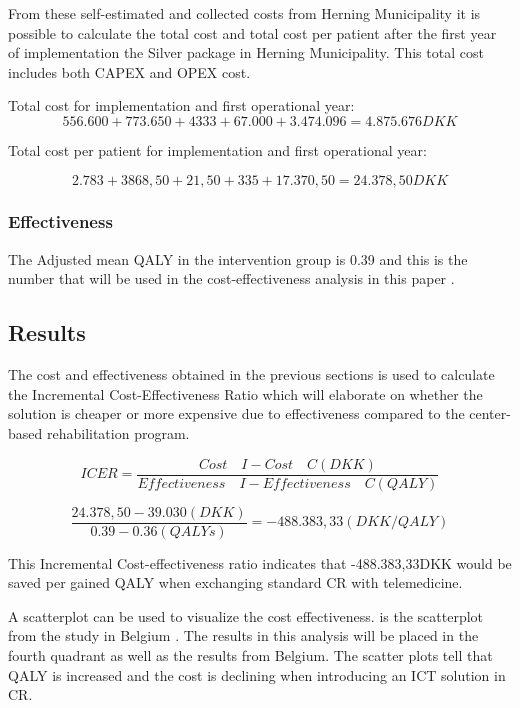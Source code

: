 From these self-estimated and collected costs from Herning Municipality it is possible to calculate the total cost and total cost per patient after the first year of implementation the Silver package in Herning Municipality. This total cost includes both CAPEX and OPEX cost.

Total cost for implementation and first operational year:
$$556.600 + 773.650 + 4333 + 67.000 + 3.474.096 = 4.875.676DKK$$

Total cost per patient for implementation and first operational year:

$$2.783+3868,50+21,50+335+17.370,50= 24.378,50DKK$$

\subsubsection{Effectiveness}

The Adjusted mean QALY in the intervention group is 0.39 and this is the number that will be used in the cost-effectiveness analysis in this paper \cite{costeffect}. 

\subsection{Results}

The cost and effectiveness obtained in the previous sections is used to calculate the Incremental Cost-Effectiveness Ratio which will elaborate on whether the solution is cheaper or more expensive due to effectiveness compared to the center-based rehabilitation program.  

$$ICER = \frac{Cost \quad I - Cost \quad C(DKK)}{Effectiveness \quad I - Effectiveness \quad C(QALY)}$$ 

$$\frac{24.378,50-39.030(DKK)}{0.39-0.36(QALYs)}=-488.383,33(DKK/QALY)$$ 

This Incremental Cost-effectiveness ratio indicates that -488.383,33DKK would be saved per gained QALY when exchanging standard CR with telemedicine. 

A scatterplot can be used to visualize the cost effectiveness.  is the scatterplot from the study in Belgium \cite{costeffect}. The results in this analysis will be placed in the fourth quadrant as well as the results from Belgium. The scatter plots tell that QALY is increased and the cost is declining when introducing an ICT solution in CR.  


